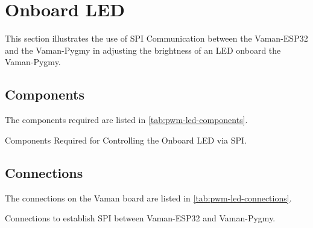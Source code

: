 \section{Onboard LED}
This section illustrates the use of SPI Communication between the Vaman-ESP32
and the Vaman-Pygmy in adjusting the brightness of an LED onboard the 
Vaman-Pygmy.

\subsection{Components}
The components required are listed in \autoref{tab:pwm-led-components}.
\begin{table}[!ht]
    \centering
    
    \caption{Components Required for Controlling the Onboard LED via SPI.}
    \label{tab:pwm-led-components}
\end{table}

\subsection{Connections}
The connections on the Vaman board are listed in
\autoref{tab:pwm-led-connections}.
\begin{table}[!ht]
    \centering
    
    \caption{Connections to establish SPI between Vaman-ESP32 and Vaman-Pygmy.}
    \label{tab:pwm-led-connections}
\end{table}

